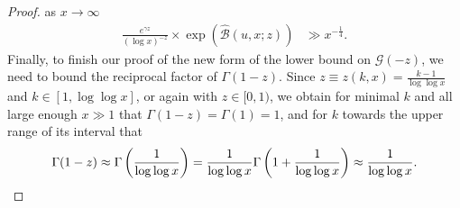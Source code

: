 \documentclass[11pt,reqno,a4letter]{article}
\numberwithin{figure}{section}
\numberwithin{table}{section}
\theoremstyle{plain}
\numberwithin{theorem}{section}
\theoremstyle{definition}
\begin{document}
\begin{proof}
as $x \rightarrow \infty$
\begin{align} 
\label{eqn_proof_tag_simpl_v1} 
\frac{e^{\gamma z}}{(\log x)^{-z}} \times \exp\left(\widehat{\mathcal{B}}(u, x; z)\right) & \gg 
     x^{-\frac{1}{4}}. 
\end{align} 
Finally, to finish our proof of the new form of the lower bound on $\mathcal{G}(-z)$, 
we need to bound the reciprocal factor of $\Gamma(1-z)$. 
Since $z \equiv z(k, x) = \frac{k-1}{\log\log x}$ and 
$k \in [1, \log\log x]$, or again with $z \in [0, 1)$, 
we obtain for minimal $k$ and all large enough $x \gg 1$ that 
$\Gamma(1-z) = \Gamma(1) = 1$, and for $k$ towards the upper range of 
its interval that 
\[
\Gamma(1-z) \approx \Gamma\left(\frac{1}{\log\log x}\right) = 
     \frac{1}{\log\log x} \Gamma\left(1 + \frac{1}{\log\log x}\right) 
     \approx \frac{1}{\log\log x}. 
     \qedhere 
\]
\end{proof} 
\end{document}
